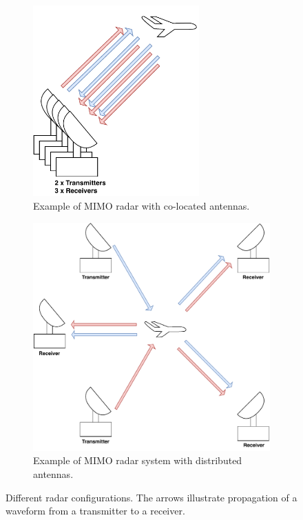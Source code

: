 \documentclass[english, 12pt, a4paper, elec, utf8, a-1b, online]{aaltothesis}
\begin{document}
\begin{figure}[htb]
\begin{subfigure}[b]{0.45\textwidth}
        \includegraphics[width=0.7\textwidth]{figures/background/radar_types_colocated_MIMO.pdf}
        \caption{Example of MIMO radar with co-located antennas.}
        \label{fig:colocated_MIMO_radar}
    \end{subfigure}
    \hfill
    \begin{subfigure}[b]{0.45\textwidth}
        \includegraphics[width=\textwidth]{figures/background/radar_types_distributed_MIMO.pdf}
        \caption{Example of MIMO radar system with distributed antennas.}
        \label{fig:distributed_MIMO_radar}
    \end{subfigure}
    \caption{Different radar configurations. The arrows illustrate propagation of a waveform from a transmitter to a receiver.}
    \label{fig:radar_types}
\end{figure}
\end{document}
